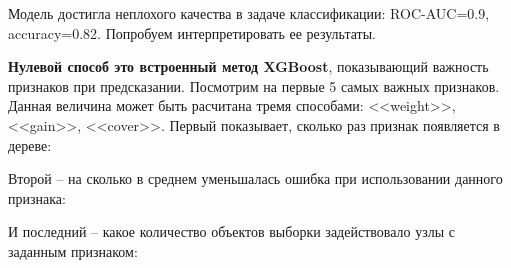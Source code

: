 Модель достигла неплохого качества в задаче классификации: ROC-AUC=0.9, accuracy=0.82. Попробуем интерпретировать ее результаты.

\textbf{Нулевой способ это встроенный метод XGBoost}, показывающий важность признаков при предсказании. Посмотрим на первые 5 самых важных признаков. Данная величина может быть расчитана тремя способами: <<weight>>, <<gain>>, <<cover>>. Первый показывает, сколько раз признак появляется в дереве:

\begin{figure}[h]
\end{figure}

Второй -- на сколько в среднем уменьшалась ошибка при использовании данного признака:

\begin{figure}[h]
\end{figure}

И последний -- какое количество объектов выборки задействовало узлы с заданным признаком:

\begin{figure}[h]
\end{figure}

